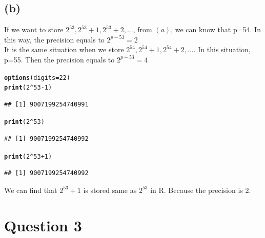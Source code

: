 \documentclass{article}\usepackage[]{graphicx}\usepackage[]{color}
\makeatletter
\newcommand{\hlnum}[1]{\textcolor[rgb]{0.686,0.059,0.569}{#1}}%
\newcommand{\hlopt}[1]{\textcolor[rgb]{0,0,0}{#1}}%
\newcommand{\hlstd}[1]{\textcolor[rgb]{0.345,0.345,0.345}{#1}}%
\newcommand{\hlkwc}[1]{\textcolor[rgb]{0.333,0.667,0.333}{#1}}%
\newcommand{\hlkwd}[1]{\textcolor[rgb]{0.737,0.353,0.396}{\textbf{#1}}}%
\newenvironment{kframe}{%
 \def\at@end@of@kframe{}%
 \ifinner\ifhmode%
  \def\at@end@of@kframe{\end{minipage}}%
  \begin{minipage}{\columnwidth}%
 \fi\fi%
 \def\FrameCommand##1{\hskip\@totalleftmargin \hskip-\fboxsep
 \colorbox{shadecolor}{##1}\hskip-\fboxsep
     \hskip-\linewidth \hskip-\@totalleftmargin \hskip\columnwidth}%
 \MakeFramed {\advance\hsize-\width
   \@totalleftmargin\z@ \linewidth\hsize
   \@setminipage}}%
 {\par\unskip\endMakeFramed%
 \at@end@of@kframe}
\newenvironment{knitrout}{}{} %
\makeatother
\begin{document}
\subsection{(b)}
If we want to store $2^{53},2^{53}+1,2^{53}+2,...$, from $(a)$, we can know that p=54. In this way, the precision equals to $2^{p-53}=2$\\
It is the same situation when we store $2^{54},2^{54}+1,2^{54}+2,...$. In this situation, p=55. Then the precision equals to $2^{p-53}=4$
\begin{knitrout}
\color{fgcolor}\begin{kframe}
\begin{alltt}
\hlkwd{options}\hlstd{(}\hlkwc{digits}\hlstd{=}\hlnum{22}\hlstd{)}
\hlkwd{print}\hlstd{(}\hlnum{2}\hlopt{^}\hlnum{53}\hlopt{-}\hlnum{1}\hlstd{)}
\end{alltt}
\begin{verbatim}
## [1] 9007199254740991
\end{verbatim}
\begin{alltt}
\hlkwd{print}\hlstd{(}\hlnum{2}\hlopt{^}\hlnum{53}\hlstd{)}
\end{alltt}
\begin{verbatim}
## [1] 9007199254740992
\end{verbatim}
\begin{alltt}
\hlkwd{print}\hlstd{(}\hlnum{2}\hlopt{^}\hlnum{53}\hlopt{+}\hlnum{1}\hlstd{)}
\end{alltt}
\begin{verbatim}
## [1] 9007199254740992
\end{verbatim}
\end{kframe}
\end{knitrout}
We can find that $2^{53}+1$ is stored same as $2^{53}$ in R. Because the precision is 2.

\section{Question 3}
\end{document}
